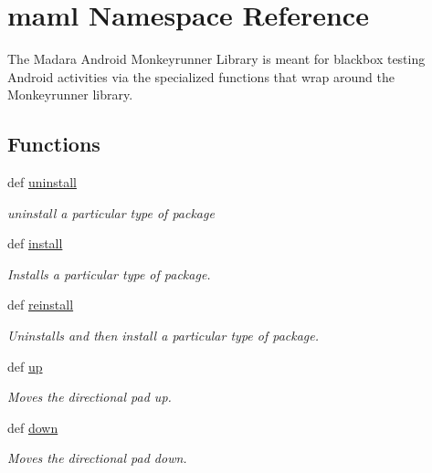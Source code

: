 \hypertarget{namespacemaml}{
\section{maml Namespace Reference}
\label{namespacemaml}
}


The Madara Android Monkeyrunner Library is meant for blackbox testing Android activities via the specialized functions that wrap around the Monkeyrunner library.  


\subsection*{Functions}
\begin{DoxyCompactItemize}
\item 
def \hyperlink{namespacemaml_ab22c6cc045b5c7960392a83e8078da7d}{uninstall}
\begin{DoxyCompactList}\small\item\em uninstall a particular type of package \item\end{DoxyCompactList}\item 
def \hyperlink{namespacemaml_a0a2f6b4501dd29d34c0df57727665771}{install}
\begin{DoxyCompactList}\small\item\em Installs a particular type of package. \item\end{DoxyCompactList}\item 
def \hyperlink{namespacemaml_a9c961efb8a1d1aec6aab385d3a921fc9}{reinstall}
\begin{DoxyCompactList}\small\item\em Uninstalls and then install a particular type of package. \item\end{DoxyCompactList}\item 
def \hyperlink{namespacemaml_accb5aae56c484b5d0a61bc6e85270e5d}{up}
\begin{DoxyCompactList}\small\item\em Moves the directional pad up. \item\end{DoxyCompactList}\item 
def \hyperlink{namespacemaml_a0a86d6304ca04313b50e95d9e5de4568}{down}
\begin{DoxyCompactList}\small\item\em Moves the directional pad down. \item\end{DoxyCompactList}\item 

\end{DoxyCompactItemize}
